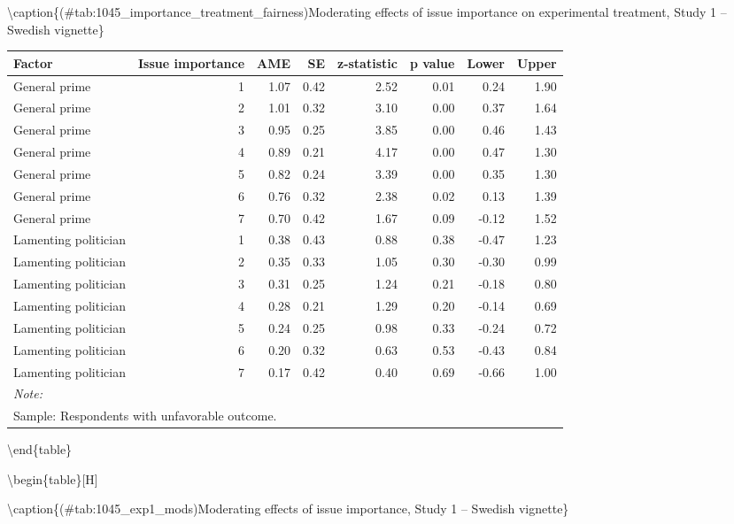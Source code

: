 \documentclass[
]{book}
\begin{document}
\textbackslash caption\{(\#tab:1045\_importance\_treatment\_fairness)Moderating effects of issue importance on experimental treatment, Study 1 -- Swedish vignette\}
\centering

\begin{tabular}[t]{lrrrrrrr}
\toprule
Factor & Issue importance & AME & SE & z-statistic & p value & Lower & Upper\\
\midrule
General prime & 1 & 1.07 & 0.42 & 2.52 & 0.01 & 0.24 & 1.90\\
General prime & 2 & 1.01 & 0.32 & 3.10 & 0.00 & 0.37 & 1.64\\
General prime & 3 & 0.95 & 0.25 & 3.85 & 0.00 & 0.46 & 1.43\\
General prime & 4 & 0.89 & 0.21 & 4.17 & 0.00 & 0.47 & 1.30\\
General prime & 5 & 0.82 & 0.24 & 3.39 & 0.00 & 0.35 & 1.30\\
\addlinespace
General prime & 6 & 0.76 & 0.32 & 2.38 & 0.02 & 0.13 & 1.39\\
General prime & 7 & 0.70 & 0.42 & 1.67 & 0.09 & -0.12 & 1.52\\
Lamenting politician & 1 & 0.38 & 0.43 & 0.88 & 0.38 & -0.47 & 1.23\\
Lamenting politician & 2 & 0.35 & 0.33 & 1.05 & 0.30 & -0.30 & 0.99\\
Lamenting politician & 3 & 0.31 & 0.25 & 1.24 & 0.21 & -0.18 & 0.80\\
\addlinespace
Lamenting politician & 4 & 0.28 & 0.21 & 1.29 & 0.20 & -0.14 & 0.69\\
Lamenting politician & 5 & 0.24 & 0.25 & 0.98 & 0.33 & -0.24 & 0.72\\
Lamenting politician & 6 & 0.20 & 0.32 & 0.63 & 0.53 & -0.43 & 0.84\\
Lamenting politician & 7 & 0.17 & 0.42 & 0.40 & 0.69 & -0.66 & 1.00\\
\bottomrule
\multicolumn{8}{l}{\textit{Note: }}\\
\multicolumn{8}{l}{Sample: Respondents with unfavorable outcome.}\\
\end{tabular}

\textbackslash end\{table\}

\textbackslash begin\{table\}{[}H{]}

\textbackslash caption\{(\#tab:1045\_exp1\_mods)Moderating effects of issue importance, Study 1 -- Swedish vignette\}
\centering
\end{document}

